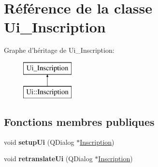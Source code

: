 \hypertarget{class_ui___inscription}{\section{Référence de la classe Ui\+\_\+\+Inscription}
\label{class_ui___inscription}
}
Graphe d'héritage de Ui\+\_\+\+Inscription\+:\begin{figure}[H]
\begin{center}
\leavevmode
\includegraphics[height=2.000000cm]{class_ui___inscription}
\end{center}
\end{figure}
\subsection*{Fonctions membres publiques}
\begin{DoxyCompactItemize}
\item 
\hypertarget{class_ui___inscription_ae761c4d04f372cc6720601d2dec0f6b5}{void {\bfseries setup\+Ui} (Q\+Dialog $\ast$\hyperlink{class_inscription}{Inscription})}\label{class_ui___inscription_ae761c4d04f372cc6720601d2dec0f6b5}

\item 
\hypertarget{class_ui___inscription_a238a9407e2696e57733e912f4119dbea}{void {\bfseries retranslate\+Ui} (Q\+Dialog $\ast$\hyperlink{class_inscription}{Inscription})}\label{class_ui___inscription_a238a9407e2696e57733e912f4119dbea}

\end{DoxyCompactItemize}
